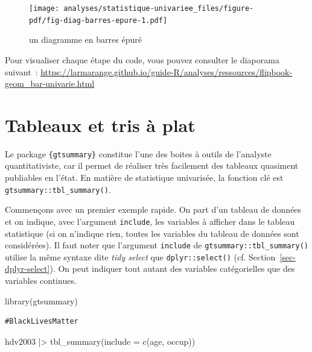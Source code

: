\documentclass[
  letterpaper,
  DIV=11,
  numbers=noendperiod,
  oneside]{scrreprt}
\newenvironment{Shaded}{\begin{snugshade}}{\end{snugshade}}
\newcommand{\AttributeTok}[1]{\textcolor[rgb]{0.40,0.45,0.13}{#1}}
\newcommand{\FunctionTok}[1]{\textcolor[rgb]{0.28,0.35,0.67}{#1}}
\newcommand{\NormalTok}[1]{\textcolor[rgb]{0.00,0.23,0.31}{#1}}
\newcommand{\SpecialCharTok}[1]{\textcolor[rgb]{0.37,0.37,0.37}{#1}}
\begin{document}
\begin{figure}[H]

{\centering \texttt{[image: analyses/statistique-univariee\_files/figure-pdf/fig-diag-barres-epure-1.pdf]}

}

\caption{\label{fig-diag-barres-epure}un diagramme en barres épuré}

\end{figure}

Pour visualiser chaque étape du code, vous pouvez consulter le diaporama
suivant~:
\url{https://larmarange.github.io/guide-R/analyses/ressources/flipbook-geom_bar-univarie.html}

\hypertarget{sec-tri-a-plat}{%
\section{Tableaux et tris à plat}\label{sec-tri-a-plat}}

Le package \texttt{\{gtsummary\}} constitue l'une des boites à outils de
l'analyste quantitativiste, car il permet de réaliser très facilement
des tableaux quasiment publiables en l'état. En matière de statistique
univarisée, la fonction clé est \texttt{gtsummary::tbl\_summary()}.

Commençons avec un premier exemple rapide. On part d'un tableau de
données et on indique, avec l'argument \texttt{include}, les variables à
afficher dans le tableau statistique (si on n'indique rien, toutes les
variables du tableau de données sont considérées). Il faut noter que
l'argument \texttt{include} de \texttt{gtsummary::tbl\_summary()}
utilise la même syntaxe dite \emph{tidy select} que
\texttt{dplyr::select()} (cf. Section~\ref{sec-dplyr-select}). On peut
indiquer tout autant des variables catégorielles que des variables
continues.

\begin{Shaded}
\begin{Highlighting}[]
\FunctionTok{library}\NormalTok{(gtsummary)}
\end{Highlighting}
\end{Shaded}

\begin{verbatim}
#BlackLivesMatter
\end{verbatim}

\begin{Shaded}
\begin{Highlighting}[]
\NormalTok{hdv2003 }\SpecialCharTok{|\textgreater{}} 
  \FunctionTok{tbl\_summary}\NormalTok{(}\AttributeTok{include =} \FunctionTok{c}\NormalTok{(age, occup))}
\end{Highlighting}
\end{Shaded}
\end{document}
